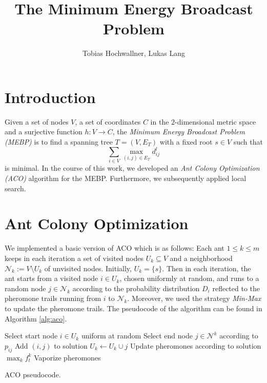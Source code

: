 \documentclass{article}
\theoremstyle{definition}
\begin{document}
\date{}
\author{Tobias Hochwallner, Lukas Lang}
\title{The Minimum Energy Broadcast Problem}
\maketitle

\section{Introduction}

Given a set of nodes $V$, a set of coordinates $C$ in the $2$-dimensional metric space and a surjective function $h: V \rightarrow C$, the \emph{Minimum Energy Broadcast Problem (MEBP)} is to find a spanning tree $T = (V, E_{T})$ with a fixed root $s \in V$ such that
\begin{equation}
	\sum_{i \in V} \max_{(i,j) \in E_{T}} d_{ij}^{l}
\end{equation}
is minimal. In the course of this work, we developed an \emph{Ant Colony Optimization (ACO)} algorithm for the MEBP. Furthermore, we subsequently applied local search.

\section{Ant Colony Optimization}

We implemented a basic version of ACO which is as follows: Each ant $1 \leq k \leq m$ keeps in each iteration a set of visited nodes $U_{k} \subseteq V$ and a neighborhood $\mathcal{N}_{k} := V \setminus U_{k}$ of unvisited nodes. Initially, $U_{k} = \{s\}$. Then in each iteration, the ant starts from a visited node $i \in U_{k}$, chosen uniformly at random, and runs to a random node $j \in \mathcal{N}_{k}$ according to the probability distribution $D_{i}$ reflected to the pheromone trails running from $i$ to $\mathcal{N}_{k}$. Moreover, we used the strategy \emph{Min-Max} to update the pheromone trails. The pseudocode of the algorithm can be found in Algorithm \ref{alg:aco}.

\begin{algorithm}
	 {
		 {
			 {
				Select start node $i \in U_{k}$ uniform at random\;
				Select end node $j \in \mathcal{N}^{k}$ according to $p_{ij}$\;
				Add $(i,j)$ to solution\;
				$U_{k} \gets U_{k} \cup j$\;
			}
		}
		Update pheromones according to solution $\max_{k} f_{t}^{k}$\;
		Vaporize pheromones\;
	}
\caption{ACO pseudocode.}
\label{alg:aco}
\end{algorithm}
\end{document}
